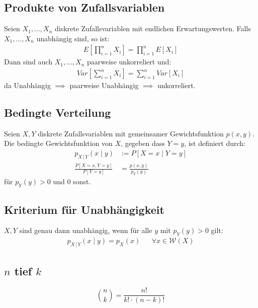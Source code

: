 \documentclass[8pt]{extarticle}
\newcommand{\W}{\mathcal{W}}
\newcommand{\Sn}{\sum_{i = 1}^n}
\newcommand{\Pn}{\prod_{i = 1}^n}
\newcommand{\cond}[2]{P[#1 \; | \; #2]}
\newcommand{\zufallsvariablen}{X_1, \dots, X_n}
\begin{document}
\begin{multicols*}{3}
  \subsection*{Produkte von Zufallsvariablen}
  Seien $\zufallsvariablen$ diskrete Zufallsvariablen mit endlichen
  Erwartungswerten. Falls $\zufallsvariablen$ unabhängig sind, so ist:
  \begin{align*}
    E \left[ \Pn X_i \right] = \Pn E[X_i]
  \end{align*}
  Dann sind auch $\zufallsvariablen$ paarweise unkorreliert und:
  \begin{align*}
    Var \left[ \Sn X_i \right] = \Sn Var[X_i]
  \end{align*}
  da Unabhängig $\implies$ paarweise Unabhängig $\implies$ unkorreliert.
  \subsection*{Bedingte Verteilung}
  Seien $X, Y$ diskrete Zufallsvariablen mit gemeinsamer Gewichtsfunktion
  $p(x, y)$. Die bedingte Gewichtsfunktion von $X$, gegeben dass $Y = y$,
  ist definiert durch:
  \begin{align*}
    p_{X \, | \, Y}(x \; | \; y)     & := \cond{X = x}{Y = y}   \\
    \frac{P[X = x, Y = y]}{P[Y = y]} & = \frac{p(x, y)}{p_Y(y)}
  \end{align*}
  für $p_Y(y) > 0$ und $0$ sonst.
  \subsection*{Kriterium für Unabhängigkeit}
  $X, Y$ sind genau dann unabhängig, wenn für alle $y$ mit $p_Y(y) > 0$
  gilt:
  \begin{align*}
    p_{X\,|\,Y}(x \; | \; y) = p_X(x) &  & \forall x \in \W(X)
  \end{align*}
  \subsection*{$n$ tief $k$}
  $$
    \binom{n}{k} = \frac{n!}{k! \cdot (n - k)!}
  $$\\

\end{multicols*}
\end{document}
